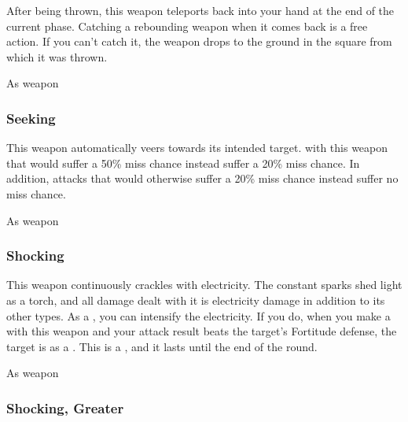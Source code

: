 After being thrown, this weapon teleports back into your hand at the end of the current phase.
Catching a rebounding weapon when it comes back is a free action.
If you can't catch it, the weapon drops to the ground in the square from which it was thrown.



 


 As weapon


\lowercase{\hypertarget{item:Seeking}{}}\label{item:Seeking}
\hypertarget{item:Seeking}{\subsubsection{Seeking\hfill{}}}

This weapon automatically veers towards its intended target.
 with this weapon that would suffer a 50\% miss chance instead suffer a 20\% miss chance.
In addition, attacks that would otherwise suffer a 20\% miss chance instead suffer no miss chance.



 


 As weapon


\lowercase{\hypertarget{item:Shocking}{}}\label{item:Shocking}
\hypertarget{item:Shocking}{\subsubsection{Shocking\hfill{}}}

This weapon continuously crackles with electricity.
The constant sparks shed light as a torch, and all damage dealt with it is electricity damage in addition to its other types.
As a , you can intensify the electricity.
If you do, when you make a  with this weapon and your attack result beats the target's Fortitude defense, the target is \dazed as a .
This is a , and it lasts until the end of the round.



 


 As weapon


\lowercase{\hypertarget{item:Shocking, Greater}{}}\label{item:Shocking, Greater}
\hypertarget{item:Shocking, Greater}{\subsubsection{Shocking, Greater\hfill{}}}

